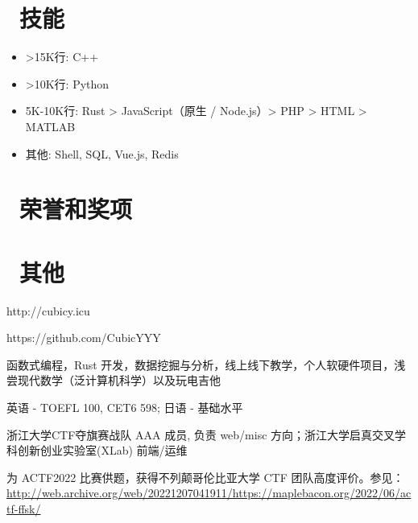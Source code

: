 \documentclass{resume}
\begin{document}
\section{\faCogs\ 技能}
\begin{itemize}[parsep=0.5ex]
  \item >15K行: C++
  \item >10K行: Python
  \item 5K-10K行: Rust > JavaScript（原生 / Node.js）> PHP > HTML > MATLAB
  \item 其他: Shell, SQL, Vue.js, Redis
\end{itemize}


\section{\faHeartO\ 荣誉和奖项}

\section{\faInfo\ 其他}
\begin{description}[parsep=0.5ex]
  \item[技术博客] http://cubicy.icu
  \item[GitHub] https://github.com/CubicYYY
  \item[个人兴趣] 函数式编程，Rust 开发，数据挖掘与分析，线上线下教学，个人软硬件项目，浅尝现代数学（泛计算机科学）以及玩电吉他
  \item[语言] 英语 - TOEFL 100, CET6 598; 日语 - 基础水平
  \item[团队参与] 浙江大学CTF夺旗赛战队 AAA 成员, 负责 web/misc 方向；浙江大学启真交叉学科创新创业实验室(XLab) 前端/运维
  \item[杂项] 为 ACTF2022 比赛供题，获得不列颠哥伦比亚大学 CTF 团队高度评价。参见：\href{http://web.archive.org/web/20221207041911/https://maplebacon.org/2022/06/actf-ffsk/}{http://web.archive.org/web/20221207041911/https://maplebacon.org/2022/06/actf-ffsk/}
\end{description}

%
%
\end{document}
